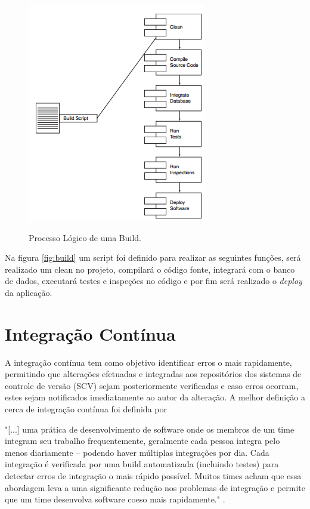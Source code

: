 \begin{figure}[h]
\centering
\caption[Processo Lógico de uma Build]{Processo Lógico de uma Build.}
\includegraphics[scale=0.7]{./images/build}
\label{fig:build}
\end{figure}
Na figura \autoref{fig:build} um script foi definido para realizar as seguintes funções, será realizado um clean no projeto, compilará o código fonte, integrará com o banco de dados, executará testes e inspeções no código e por fim será realizado o \textit{deploy} da aplicação.



\section{Integração Contínua}\label{integracaocont}
\begin{OnehalfSpace}
A integração contínua tem como objetivo identificar erros o mais rapidamente, permitindo que alterações efetuadas e integradas aos repositórios dos sistemas de controle de versão (SCV) sejam posteriormente verificadas e caso erros ocorram, estes sejam notificados imediatamente ao autor da alteração.
A melhor definição a cerca de integração contínua foi definida por 
\end{OnehalfSpace}

\begin{citacao}
"[...] uma prática de desenvolvimento de software onde os membros de um time integram seu trabalho frequentemente, geralmente cada pessoa integra pelo menos diariamente – podendo haver múltiplas integrações por dia. Cada integração é verificada por uma build automatizada (incluindo testes) para detectar erros de integração o mais rápido possível. Muitos times acham que essa abordagem leva a uma significante redução nos problemas de integração e permite que um time desenvolva software coeso mais rapidamente." .
\end{citacao}

